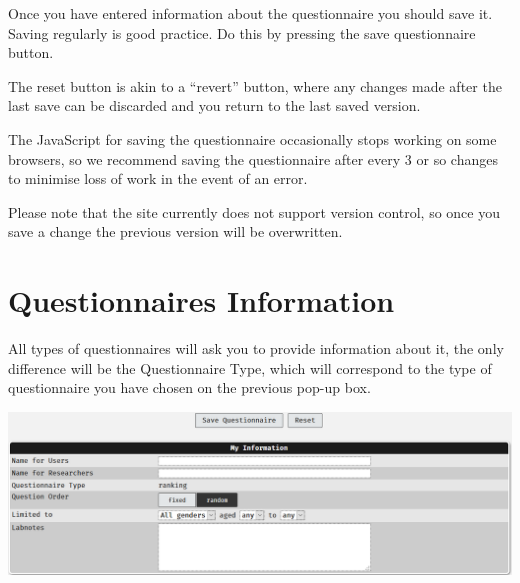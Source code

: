 \documentclass[]{book}
\begin{document}
Once you have entered information about the questionnaire you should save it. Saving regularly is good practice. Do this by pressing the save questionnaire button.

The reset button is akin to a ``revert'' button, where any changes made after the last save can be discarded and you return to the last saved version.

\begin{danger}
The JavaScript for saving the questionnaire occasionally stops working
on some browsers, so we recommend saving the questionnaire after every 3
or so changes to minimise loss of work in the event of an error.

Please note that the site currently does not support version control, so
once you save a change the previous version will be overwritten.
\end{danger}

\hypertarget{questionnaires-information}{%
\section{Questionnaires Information}\label{questionnaires-information}}

All types of questionnaires will ask you to provide information about it, the only difference will be the Questionnaire Type, which will correspond to the type of questionnaire you have chosen on the previous pop-up box.

\includegraphics{images/screenshots/quest_info.png}
\end{document}
